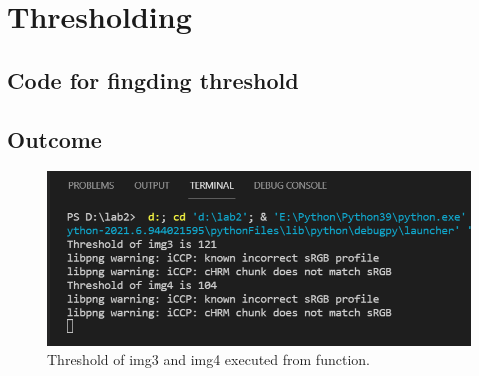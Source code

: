 \documentclass[14pt]{article}
\begin{document}
\section{Thresholding}
\subsection{Code for fingding threshold}

\subsection{Outcome}

\begin{figure}[hbt!]
	\centering
	\includegraphics[width=\linewidth]{thValue.png}
	\caption{Threshold of img3 and img4 executed from function.}	
\end{figure}
\end{document}
